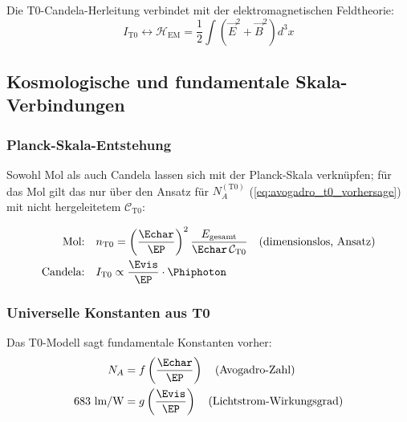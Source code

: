 	Die T0-Candela-Herleitung verbindet mit der elektromagnetischen Feldtheorie:
	\begin{equation}
		I_{\text{T0}} \leftrightarrow \mathcal{H}_{\text{EM}} = \frac{1}{2}\int (\vec{E}^2 + \vec{B}^2) d^3x
		\label{eq:candela_em_verbindung}
	\end{equation}
	
	\subsection{Kosmologische und fundamentale Skala-Verbindungen}
	\label{subsec:kosmologische_verbindungen}
	
	\subsubsection{Planck-Skala-Entstehung}
	\label{subsubsec:planck_skala_entstehung}
	
	Sowohl Mol als auch Candela lassen sich mit der Planck-Skala verknüpfen; für das Mol gilt das nur über den Ansatz für $N_A^{(\text{T0})}$ (\cref{eq:avogadro_t0_vorhersage}) mit nicht hergeleitetem $\mathcal{C}_{\text{T0}}$:
	
	\begin{align}
		\text{Mol:} \quad &n_{\text{T0}} = \left(\frac{\Echar}{\EP}\right)^2 \frac{E_{\text{gesamt}}}{\Echar\,\mathcal{C}_{\text{T0}}} \quad \text{(dimensionslos, Ansatz)} \\
		\text{Candela:} \quad &I_{\text{T0}} \propto \frac{\Evis}{\EP} \cdot \Phiphoton
	\end{align}
	
	\subsubsection{Universelle Konstanten aus T0}
	\label{subsubsec:universelle_konstanten_t0}
	
	Das T0-Modell sagt fundamentale Konstanten vorher:
	\begin{align}
		N_A &= f\left(\frac{\Echar}{\EP}\right) \quad \text{(Avogadro-Zahl)} \\
		683 \text{ lm/W} &= g\left(\frac{\Evis}{\EP}\right) \quad \text{(Lichtstrom-Wirkungsgrad)}
	\end{align}
